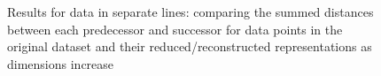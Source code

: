 \documentclass[pdftex,12pt,a4paper]{report}
\begin{document}
\begin{figure}[htb!]
    \caption{Results for data in separate lines: comparing the summed distances between each predecessor and successor for data points in the original dataset and their reduced/reconstructed representations as dimensions increase}\label{fig:cpca-avg_dev_vs_high_dim-seplines}
\end{figure}
\end{document}
